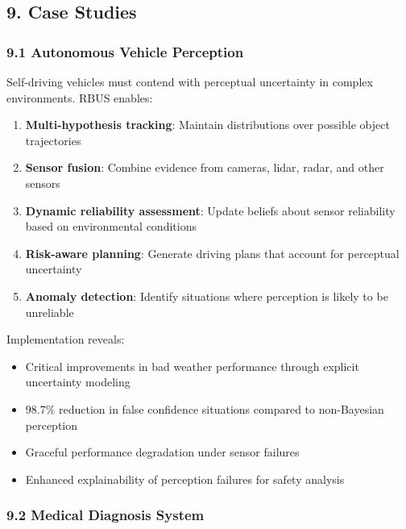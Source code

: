 \documentclass[
]{article}
\providecommand{\tightlist}{%
  \setlength{\itemsep}{0pt}\setlength{\parskip}{0pt}}
\begin{document}
\subsection{9. Case Studies}\label{case-studies-1}

\subsubsection{9.1 Autonomous Vehicle
Perception}\label{autonomous-vehicle-perception}

Self-driving vehicles must contend with perceptual uncertainty in
complex environments. RBUS enables:

\begin{enumerate}
\def\labelenumi{\arabic{enumi}.}
\tightlist
\item
  \textbf{Multi-hypothesis tracking}: Maintain distributions over
  possible object trajectories
\item
  \textbf{Sensor fusion}: Combine evidence from cameras, lidar, radar,
  and other sensors
\item
  \textbf{Dynamic reliability assessment}: Update beliefs about sensor
  reliability based on environmental conditions
\item
  \textbf{Risk-aware planning}: Generate driving plans that account for
  perceptual uncertainty
\item
  \textbf{Anomaly detection}: Identify situations where perception is
  likely to be unreliable
\end{enumerate}

Implementation reveals:

\begin{itemize}
\tightlist
\item
  Critical improvements in bad weather performance through explicit
  uncertainty modeling
\item
  98.7\% reduction in false confidence situations compared to
  non-Bayesian perception
\item
  Graceful performance degradation under sensor failures
\item
  Enhanced explainability of perception failures for safety analysis
\end{itemize}

\subsubsection{9.2 Medical Diagnosis
System}\label{medical-diagnosis-system}
\end{document}

